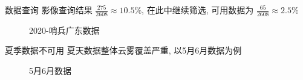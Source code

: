 \begin{frame}{数据查询}
    \small{影像查询结果 $\frac{275}{2608} \approx 10.5\%$}, 在此中继续筛选, 可用数据为 $\frac{65}{2608} \approx 2.5\% $
    \begin{figure}[!htbp]
        \centering
        \quad
        \caption{2020-哨兵广东数据}
        \label{fig:0102}
    \end{figure}
\end{frame}

\begin{frame}{夏季数据不可用}
    \small{夏天数据整体云雾覆盖严重, 以5月6月数据为例}
    \begin{figure}[!htbp]
        \centering
        \quad
        \caption{5月6月数据}
        \label{fig:0103}
    \end{figure}
\end{frame}

